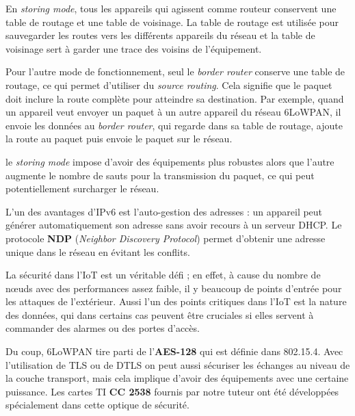 En \textit{storing mode}, tous les appareils qui agissent comme routeur conservent une table de routage et une table de voisinage. La table de routage est utilisée pour sauvegarder les routes vers les différents appareils du réseau et la table de voisinage sert à garder une trace des voisins de l'équipement. 

Pour l'autre mode de fonctionnement, seul le \textit{border router} conserve une table de routage, ce qui permet d'utiliser du \textit{source routing}. Cela signifie que le paquet doit inclure la route complète pour atteindre sa destination. Par exemple, quand un appareil veut envoyer un paquet à un autre appareil du réseau 6LoWPAN, il envoie les données au \textit{border router}, qui regarde dans sa table de routage, ajoute la route au paquet puis envoie le paquet sur le réseau.

le \textit{storing mode} impose d'avoir des équipements plus robustes alors que l'autre augmente le nombre de sauts pour la transmission du paquet, ce qui peut potentiellement surcharger le réseau.

L'un des avantages d'IPv6 est l'auto-gestion des adresses : un appareil peut générer automatiquement son adresse sans avoir recours à un serveur DHCP. Le protocole \textbf{NDP} (\textit{Neighbor Discovery Protocol}) permet d'obtenir une adresse unique dans le réseau en évitant les conflits.

La sécurité dans l'IoT est un véritable défi ; en effet, à cause du nombre de nœuds avec des performances assez faible, il y beaucoup de points d'entrée pour les attaques de l'extérieur. Aussi l'un des points critiques dans l'IoT est la nature des données, qui dans certains cas peuvent être cruciales si elles servent à commander des alarmes ou des portes d'accès.

Du coup, 6LoWPAN tire parti de l'\textbf{AES-128} qui est définie dans 802.15.4. Avec l'utilisation de TLS ou de DTLS on peut aussi sécuriser les échanges au niveau de la couche transport, mais cela implique d'avoir des équipements avec une certaine puissance. Les cartes TI \textbf{CC 2538} fournis par notre tuteur ont été développées spécialement dans cette optique de sécurité.
